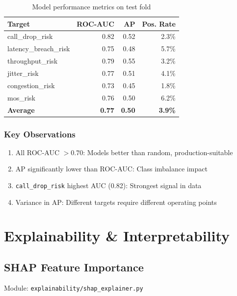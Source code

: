 \documentclass[11pt,a4paper,oneside]{report}
\begin{document}
\begin{table}[h]
\centering
\begin{tabular}{lrrr}
\toprule
\textbf{Target} & \textbf{ROC-AUC} & \textbf{AP} & \textbf{Pos. Rate} \\
\midrule
call\_drop\_risk & 0.82 & 0.52 & 2.3\% \\
latency\_breach\_risk & 0.75 & 0.48 & 5.7\% \\
throughput\_risk & 0.79 & 0.55 & 3.2\% \\
jitter\_risk & 0.77 & 0.51 & 4.1\% \\
congestion\_risk & 0.73 & 0.45 & 1.8\% \\
mos\_risk & 0.76 & 0.50 & 6.2\% \\
\midrule
\textbf{Average} & \textbf{0.77} & \textbf{0.50} & \textbf{3.9\%} \\
\bottomrule
\end{tabular}
\caption{Model performance metrics on test fold}
\end{table}

\subsection{Key Observations}

\begin{enumerate}
    \item All ROC-AUC $> 0.70$: Models better than random, production-suitable
    \item AP significantly lower than ROC-AUC: Class imbalance impact
    \item \texttt{call\_drop\_risk} highest AUC (0.82): Strongest signal in data
    \item Variance in AP: Different targets require different operating points
\end{enumerate}

\newpage

\chapter{Explainability \& Interpretability}

\section{SHAP Feature Importance}

Module: \texttt{explainability/shap\_explainer.py}
\end{document}
